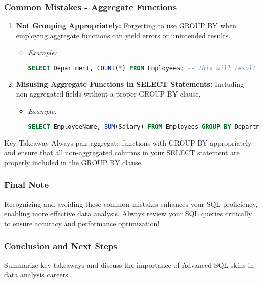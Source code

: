 \documentclass[aspectratio=169]{beamer}
\begin{document}
\begin{frame}[fragile]
    \frametitle{Common Mistakes - Aggregate Functions}
    \begin{enumerate}
        \item \textbf{Not Grouping Appropriately:} Forgetting to use GROUP BY when employing aggregate functions can yield errors or unintended results.
        \begin{itemize}
            \item \textit{Example:}
            \begin{lstlisting}[language=SQL]
SELECT Department, COUNT(*) FROM Employees; -- This will result in an error; GROUP BY is needed.
            \end{lstlisting}
        \end{itemize}

        \item \textbf{Misusing Aggregate Functions in SELECT Statements:} Including non-aggregated fields without a proper GROUP BY clause.
        \begin{itemize}
            \item \textit{Example:}
            \begin{lstlisting}[language=SQL]
SELECT EmployeeName, SUM(Salary) FROM Employees GROUP BY Department;  -- EmployeeName cannot be used without a grouping.
            \end{lstlisting}
        \end{itemize}
    \end{enumerate}
    \begin{block}{Key Takeaway}
        Always pair aggregate functions with GROUP BY appropriately and ensure that all non-aggregated columns in your SELECT statement are properly included in the GROUP BY clause.
    \end{block}
\end{frame}

\begin{frame}[fragile]
    \frametitle{Final Note}
    Recognizing and avoiding these common mistakes enhances your SQL proficiency, enabling more effective data analysis. Always review your SQL queries critically to ensure accuracy and performance optimization!
\end{frame}

\begin{frame}[fragile]
    \frametitle{Conclusion and Next Steps}
    Summarize key takeaways and discuss the importance of Advanced SQL skills in data analysis careers.
\end{frame}
\end{document}

